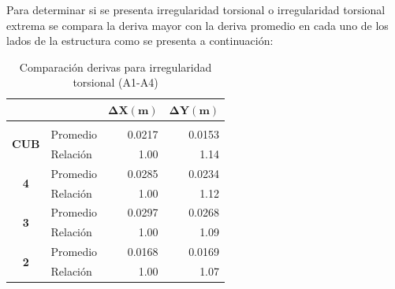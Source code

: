 \documentclass[12pt]{article}
\begin{document}
Para determinar si se presenta irregularidad torsional o irregularidad torsional extrema se compara la deriva mayor con la deriva promedio en cada uno de los lados de la estructura como se presenta a continuación:
\begin{table}[H]
  \centering
  
    \begin{tabular}{|c|l|r|r|}
\cline{3-4}    \multicolumn{1}{r}{} &     & \multicolumn{1}{c|}{\cellcolor[rgb]{ .2,  .247,  .31}\textcolor[rgb]{ 1,  1,  1}{$\mathbf{\Delta X (m)}$}} & \multicolumn{1}{c|}{\cellcolor[rgb]{ .2,  .247,  .31}\textcolor[rgb]{ 1,  1,  1}{\textbf{$\mathbf{\Delta Y (m)}$}}} \bigstrut\\
    \hline
    \rowcolor[rgb]{ .2,  .247,  .31} \multicolumn{4}{|c|}{\textcolor[rgb]{ 1,  1,  1}{\textbf{A1-A4}}} \bigstrut\\
    \hline
    \multirow{2}[4]{*}{\textbf{CUB}} & Promedio & 0.0217 & 0.0153 \bigstrut\\
\cline{2-4}        & Relación & 1.00 & 1.14 \bigstrut\\
    \hline
    \multirow{2}[4]{*}{\textbf{4}} & Promedio & 0.0285 & 0.0234 \bigstrut\\
\cline{2-4}        & Relación & 1.00 & 1.12 \bigstrut\\
    \hline
    \multirow{2}[4]{*}{\textbf{3}} & Promedio & 0.0297 & 0.0268 \bigstrut\\
\cline{2-4}        & Relación & 1.00 & 1.09 \bigstrut\\
    \hline
    \multirow{2}[4]{*}{\textbf{2}} & Promedio & 0.0168 & 0.0169 \bigstrut\\
\cline{2-4}        & Relación & 1.00 & 1.07 \bigstrut\\
    \hline
    \end{tabular}%
    \caption{Comparación derivas para irregularidad torsional (A1-A4)}
  \label{tab:A1-A4}%
\end{table}%
\end{document}
